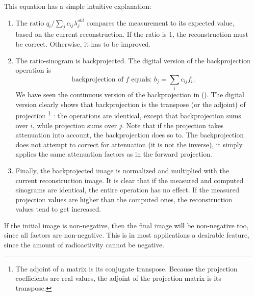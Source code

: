 This equation has a simple intuitive explanation:
\begin{enumerate}
\item
The ratio $q_i / \sum_j c_{ij} \lambda_j^{old}$ compares the measurement to
its expected value, based on the current reconstruction. If the ratio is
1, the reconstruction must be correct. Otherwise, it has to be improved.

\item
The ratio-sinogram is backprojected. The digital version of the backprojection
operation is
\begin{equation}
  \mbox{backprojection of $f$ equals: } b_j = \sum_i c_{ij} f_i.
\end{equation}
We have seen the continuous version of the backprojection in
(). The digital version clearly shows that
backprojection is the transpose (or the adjoint) of projection
\footnote{The adjoint of a matrix is its conjugate transpose. Because
  the projection coefficients are real values, the adjoint of the
  projection matrix is its transpose.}
: the operations are identical, except that backprojection sums over $i$,
while projection sums over $j$. Note that if the projection takes
attenuation into account, the backprojection does so to. The
backprojection does not attempt to correct for attenuation (it is not
the inverse), it simply applies the same attenuation factors as in the
forward projection.

\item
Finally, the backprojected image is normalized and multiplied with the current
reconstruction image.  It is clear that if the measured and computed sinograms
are identical, the entire operation has no effect. If the measured projection
values are higher than the computed ones, the reconstruction values tend to
get increased.
\end{enumerate}

If the initial image is non-negative, then the final image will be
non-negative too, since all factors are non-negative. This is in most
applications a desirable feature, since the amount of radioactivity
cannot be negative.

